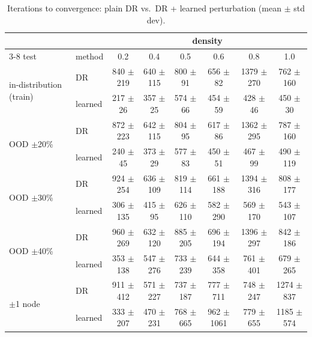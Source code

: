 \begin{table}[H]
  \centering
  \caption{Iterations to convergence: plain DR vs.\ DR + learned perturbation (mean $\pm$ std dev).}
  \label{tab:iterations_std}
  \small
  \begin{tabular}{ll cccccc}
    \toprule
    & & \multicolumn{6}{c}{density} \\
    \cmidrule(lr){3-8}
    test & method & 0.2 & 0.4 & 0.5 & 0.6 & 0.8 & 1.0 \\
    \midrule
    \multirow{2}{*}{in-distribution (train)}
      & DR      & 840 $\pm$ 219 & 640 $\pm$ 115 & 800 $\pm$ 91 & 656 $\pm$ 82 & 1379 $\pm$ 270 & 762 $\pm$ 160 \\
      & learned & 217 $\pm$ 26 & 357 $\pm$ 25 & 574 $\pm$ 66 & 454 $\pm$ 59 & 428 $\pm$ 46 & 450 $\pm$ 30 \\
    \midrule
    \multirow{2}{*}{OOD $\pm$20\%}
      & DR      & 872 $\pm$ 223 & 642 $\pm$ 115 & 804 $\pm$ 95 & 617 $\pm$ 86 & 1362 $\pm$ 295 & 787 $\pm$ 160 \\
      & learned & 240 $\pm$ 45 & 373 $\pm$ 29 & 577 $\pm$ 83 & 450 $\pm$ 51 & 467 $\pm$ 99 & 490 $\pm$ 119 \\
    \midrule
    \multirow{2}{*}{OOD $\pm$30\%}
      & DR      & 924 $\pm$ 254 & 636 $\pm$ 109 & 819 $\pm$ 114 & 661 $\pm$ 188 & 1394 $\pm$ 316 & 808 $\pm$ 177 \\
      & learned & 306 $\pm$ 135 & 415 $\pm$ 95 & 626 $\pm$ 110 & 582 $\pm$ 290 & 569 $\pm$ 170 & 543 $\pm$ 107 \\
    \midrule
    \multirow{2}{*}{OOD $\pm$40\%}
      & DR      & 960 $\pm$ 269 & 632 $\pm$ 120 & 885 $\pm$ 205 & 696 $\pm$ 194 & 1396 $\pm$ 297 & 842 $\pm$ 186 \\
      & learned & 353 $\pm$ 138 & 547 $\pm$ 276 & 733 $\pm$ 239 & 644 $\pm$ 358 & 761 $\pm$ 401 & 679 $\pm$ 265 \\
    \midrule
    \multirow{2}{*}{$\pm$1 node}
      & DR      & 911 $\pm$ 412 & 571 $\pm$ 227 & 737 $\pm$ 187 & 777 $\pm$ 711 & 748 $\pm$ 247 & 1274 $\pm$ 837 \\
      & learned & 333 $\pm$ 207 & 470 $\pm$ 231 & 768 $\pm$ 665 & 962 $\pm$ 1061 & 779 $\pm$ 655 & 1185 $\pm$ 574 \\
    \bottomrule
  \end{tabular}
\end{table}
